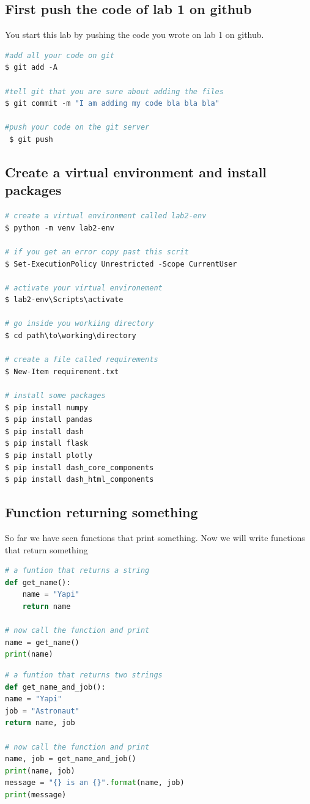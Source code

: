 \documentclass[10pt,a4paper,titlepage]{article}
\begin{document}
\subsection{First push the code of lab 1 on github} 
You start this lab by pushing the code you wrote on lab 1 on github.

\begin{lstlisting}[language=python]
#add all your code on git
$ git add -A

#tell git that you are sure about adding the files
$ git commit -m "I am adding my code bla bla bla"

#push your code on the git server
 $ git push
\end{lstlisting}

\subsection{Create a virtual environment and install packages}
\begin{lstlisting}[language=python]
# create a virtual environment called lab2-env
$ python -m venv lab2-env

# if you get an error copy past this scrit
$ Set-ExecutionPolicy Unrestricted -Scope CurrentUser

# activate your virtual environement
$ lab2-env\Scripts\activate

# go inside you workiing directory
$ cd path\to\working\directory

# create a file called requirements
$ New-Item requirement.txt

# install some packages
$ pip install numpy
$ pip install pandas
$ pip install dash
$ pip install flask
$ pip install plotly
$ pip install dash_core_components
$ pip install dash_html_components

\end{lstlisting}
\subsection{Function returning something}
So far we have seen functions that print something. Now we will write functions that return something
\begin{lstlisting}[language=python]
# a funtion that returns a string
def get_name():
	name = "Yapi"
	return name
	
# now call the function and print
name = get_name()
print(name)
\end{lstlisting}

\begin{lstlisting}[language=python]
# a funtion that returns two strings
def get_name_and_job():
name = "Yapi"
job = "Astronaut"
return name, job

# now call the function and print
name, job = get_name_and_job()
print(name, job)
message = "{} is an {}".format(name, job)
print(message)
\end{lstlisting}
\end{document}
